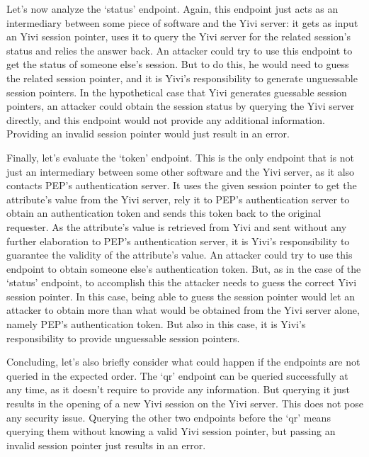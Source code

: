 \documentclass{report}
\begin{document}
Let's now analyze the \enquote*{status} endpoint. Again, this endpoint just acts as an intermediary between some piece of software and the Yivi server: it gets as input an Yivi
session pointer, uses it to query the Yivi server for the related session's status and relies the answer back. An attacker could try to use this endpoint to get the status of
someone else's session. But to do this, he would need to guess the related session pointer, and it is Yivi's responsibility to generate unguessable session pointers. In the
hypothetical case that Yivi generates guessable session pointers, an attacker could obtain the session status by querying the Yivi server directly, and this endpoint would not
provide any additional information. Providing an invalid session pointer would just result in an error. \par
Finally, let's evaluate the \enquote*{token} endpoint. This is the only endpoint that is not just an intermediary between some other software and the Yivi server, as it also
contacts PEP's authentication server. It uses the given session pointer to get the attribute's value from the Yivi server, rely it to PEP's authentication server to obtain an
authentication token and sends this token back to the original requester. As the attribute's value is retrieved from Yivi and sent without any further elaboration to PEP's
authentication server, it is Yivi's responsibility to guarantee the validity of the attribute's value. An attacker could try to use this endpoint to obtain someone else's
authentication token. But, as in the case of the \enquote*{status} endpoint, to accomplish this the attacker needs to guess the correct Yivi session pointer. In this case, being
able to guess the session pointer would let an attacker to obtain more than what would be obtained from the Yivi server alone, namely PEP's authentication token. But also in this
case, it is Yivi's responsibility to provide unguessable session pointers. \par
Concluding, let's also briefly consider what could happen if the endpoints are not queried in the expected order. The \enquote*{qr} endpoint can be queried successfully at any
time, as it doesn't require to provide any information. But querying it just results in the opening of a new Yivi session on the Yivi server. This does not pose any security
issue. Querying the other two endpoints before the \enquote*{qr} means querying them without knowing a valid Yivi session pointer, but passing an invalid session pointer just
results in an error. \par
\end{document}
